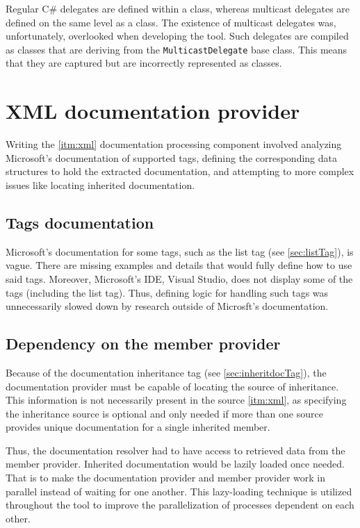 Regular C\# delegates are defined within a class, whereas multicast delegates are defined on the same level as a class.
The existence of multicast delegates was, unfortunately, overlooked when developing the tool.
Such delegates are compiled as classes that are deriving from the \lstinline[language=csh]{MulticastDelegate} base class.
This means that they are captured but are incorrectly represented as classes.

\section{XML documentation provider}

Writing the \ref{itm:xml} documentation processing component involved analyzing Microsoft's documentation of supported tags, defining the corresponding data structures to hold the extracted documentation, and attempting to more complex issues like locating inherited documentation.

\subsection{Tags documentation}

Microsoft's documentation for some tags, such as the list tag (see \ref{sec:listTag}), is vague. There are missing examples and details that would fully define how to use said tags. Moreover, Microsoft's IDE, Visual Studio, does not display some of the tags (including the list tag). Thus, defining logic for handling such tags was unnecessarily slowed down by research outside of Microsft's documentation.

\subsection{Dependency on the member provider}

Because of the documentation inheritance tag (see \ref{sec:inheritdocTag}), the documentation provider must be capable of locating the source of inheritance. This information is not necessarily present in the source \ref{itm:xml}, as specifying the inheritance source is optional and only needed if more than one source provides unique documentation for a single inherited member.

Thus, the documentation resolver had to have access to retrieved data from the member provider. Inherited documentation would be lazily loaded once needed. That is to make the documentation provider and member provider work in parallel instead of waiting for one another. This lazy-loading technique is utilized throughout the tool to improve the parallelization of processes dependent on each other.

